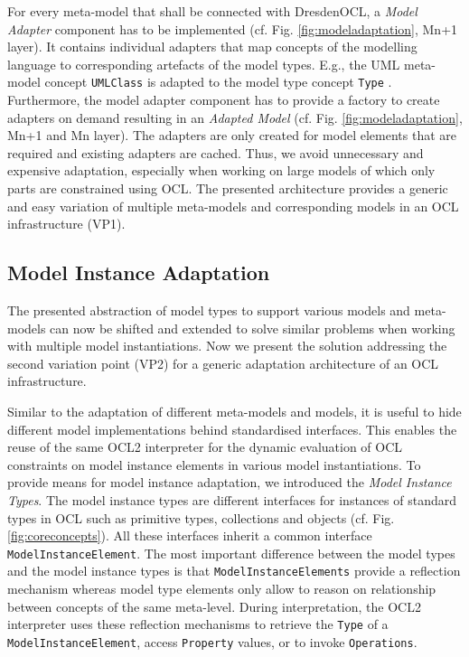 	For every meta-model that shall be connected with DresdenOCL, 
	a \emph{Model Adapter} component has to be implemented (cf. Fig. \ref{fig:modeladaptation}, Mn+1 layer). 
	It contains individual adapters that map concepts of the modelling
	language to corresponding artefacts of the model types. E.g., the UML
	meta-model concept \texttt{UMLClass} is adapted to the model type concept
	\texttt{Type} . 
	Furthermore, the model adapter component has to provide a factory to create 
	adapters on demand resulting in an \textit{Adapted Model} (cf. Fig.
	\ref{fig:modeladaptation}, Mn+1 and Mn layer).
	The adapters are only created for model elements that are required and
	existing adapters are cached. Thus, we avoid unnecessary and expensive adaptation, 
	especially when working on large models of which only parts are constrained using OCL.
	The presented architecture provides a generic and easy variation of multiple meta-models
	and corresponding models in an OCL infrastructure (VP1).


\subsection{Model Instance Adaptation}
	
	The presented abstraction of model types to support various models
	and meta-models can now be shifted and extended to
	solve similar problems when working with multiple model instantiations. Now we
	present the solution addressing the second variation point (VP2) for a generic adaptation
	architecture of an OCL infrastructure.
	
	Similar to the adaptation of different meta-models and models, it is
	useful to hide different model implementations
	behind standardised interfaces. This enables the
	reuse of the same OCL2 interpreter for the dynamic
	evaluation of OCL constraints on model instance elements in various model
	instantiations. To provide means for model
	instance adaptation, we introduced the \emph{Model Instance
	Types}. The model instance types are different
	interfaces for instances of standard types in OCL such as primitive types, 
	collections and objects (cf. Fig. \ref{fig:coreconcepts}). 
	All these	interfaces inherit a common interface \texttt{ModelInstanceElement}. The most 
	important difference between the model types and the model instance types
	is that \texttt{ModelInstanceElements} provide a reflection mechanism whereas 
	model type elements only allow to reason on relationship between concepts of
	the same meta-level. During interpretation, the OCL2 interpreter uses these reflection mechanisms to
	retrieve the \texttt{Type} of a \texttt{ModelInstanceElement}, access \texttt{Property}
	values, or to invoke \texttt{Operations}.
	
